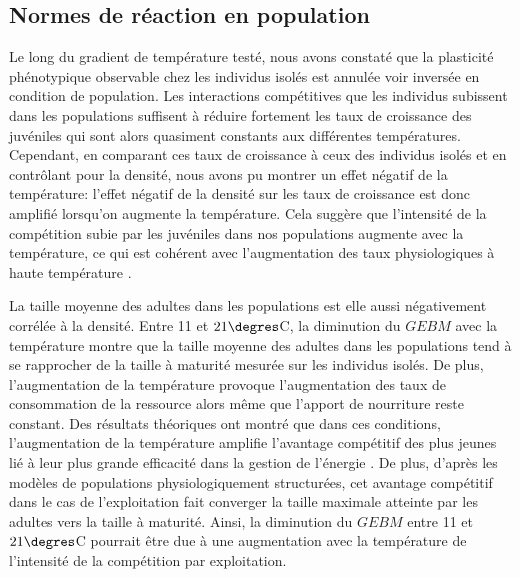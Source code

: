 \subsection{Normes de réaction en population}

Le long du gradient de température testé, nous avons constaté que la plasticité
phénotypique observable chez les individus isolés est annulée voir inversée en
condition de population. Les interactions compétitives que les individus
subissent dans les populations suffisent à réduire fortement les taux de
croissance des juvéniles qui sont alors quasiment constants aux différentes
températures. Cependant, en comparant ces taux de croissance à ceux des
individus isolés et en contrôlant pour la densité, nous avons pu montrer un
effet négatif de la température: l'effet négatif de la densité sur les taux de
croissance est donc amplifié lorsqu'on augmente la température. Cela suggère que
l'intensité de la compétition subie par les juvéniles dans nos populations
augmente avec la température, ce qui est cohérent avec l'augmentation des taux
physiologiques à haute température \autocites{gillooly2001a}.

La taille moyenne des adultes dans les populations est elle aussi négativement
corrélée à la densité. Entre 11 et $21\degres$C, la diminution du $GEBM$ avec la
température montre que la taille moyenne des adultes dans les populations tend à
se rapprocher de la taille à maturité mesurée sur les individus isolés. De plus,
l'augmentation de la température provoque l'augmentation des taux de
consommation de la ressource alors même que l'apport de nourriture reste
constant. Des résultats théoriques ont montré que dans ces conditions,
l'augmentation de la température amplifie l'avantage compétitif des plus jeunes
lié à leur plus grande efficacité dans la gestion de l'énergie
\autocites{ohlberger2011a}.
De plus, d'après les modèles de populations physiologiquement structurées, cet
avantage compétitif dans le cas de l'exploitation fait converger la taille
maximale atteinte par les adultes vers la taille à maturité. Ainsi, la
diminution du $GEBM$ entre 11 et $21\degres$C pourrait être due à une
augmentation avec la température de l'intensité de la compétition par
exploitation. 


